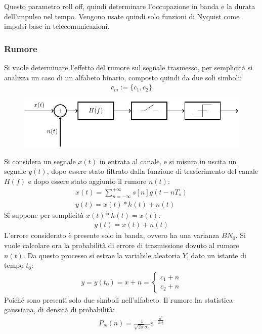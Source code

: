 \documentclass{article}
\numberwithin{equation}{subsection}
\begin{document}
Questo parametro roll off, quindi determinare l'occupazione in banda e la durata dell'impulso nel tempo. Vengono usate quindi solo funzioni di Nyquist come impulsi base 
in telecomunicazioni. 

\subsubsection{Rumore}

Si vuole determinare l'effetto del rumore sul segnale trasmesso, per semplicità si analizza un caso di un alfabeto binario, composto quindi da due soli simboli:
\begin{gather*}
    c_m:=\biggl\{c_1,c_2\biggr\}
\end{gather*}
\begin{figure}[H]%
    \centering
    \includegraphics{modulatore.pdf}
\end{figure}   
Si considera un segnale $x(t)$ in entrata al canale, e si misura in uscita un segnale $y(t)$, dopo essere stato filtrato dalla funzione di trasferimento del canale $H(f)$ 
e dopo essere stato aggiunto il rumore $n(t)$:
\begin{gather*}
    x(t)=\displaystyle\sum_{n=-\infty}^{+\infty}s[n]g(t-nT_s)\\
    y(t)=x(t)*h(t)+n(t)
\end{gather*}
Si suppone per semplicità $x(t)*h(t)=x(t)$:
\begin{gather*}
    y(t)=x(t)+n(t)
\end{gather*}
L'errore considerato è presente solo in banda, ovvero ha una varianza $BN_0$. Si vuole calcolare ora la probabilità di errore di trasmissione dovuto al rumore $n(t)$. 
Da questo processo si estrae la variabile aleatoria $Y$, dato un istante di tempo $t_0$:
\begin{gather*}
    y=y(t_0)=x+n=\begin{cases}
        c_1+n\\
        c_2+n
    \end{cases}
\end{gather*}
Poiché sono presenti solo due simboli nell'alfabeto. 
Il rumore ha statistica gaussiana, di densità di probabilità:
\begin{gather*}
    P_N(n)=\displaystyle\frac{1}{\sqrt{2\pi}\sigma_n}e^{-\frac{n^2}{2\sigma_n^2}}
\end{gather*}
\end{document}
